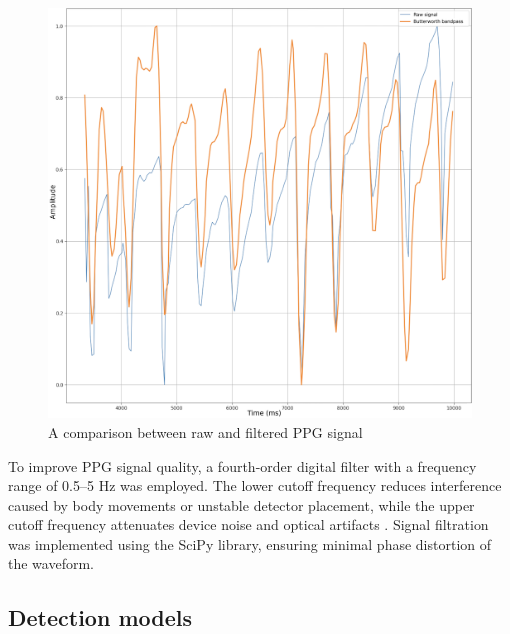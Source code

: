 \documentclass{citask}
\begin{document}
\begin{figure}[htbp]
    \centering
    \includegraphics[width=0.76\linewidth]{images/Filtr_PPG.png} 
    \caption{A comparison between raw and filtered PPG signal}
    \label{fig:filtr_ppg}
\end{figure}

To improve PPG signal quality, a fourth-order digital filter with a frequency range of 0.5–5 Hz was employed. The lower cutoff frequency reduces interference caused by body movements or unstable detector placement, while the upper cutoff frequency attenuates device noise and optical artifacts \cite{26}. Signal filtration was implemented using the SciPy library, ensuring minimal phase distortion of the waveform.



\subsection{Detection models}
\end{document}
